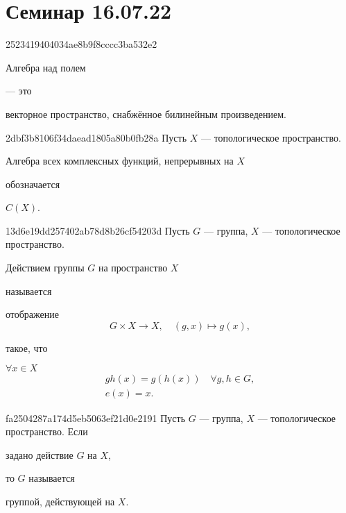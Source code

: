 


\section{Семинар 16.07.22}
\begin{note}{2523419404034ae8b9f8cccc3ba532e2}
    \begin{icloze}{2}Алгебра над полем\end{icloze} --- это \begin{icloze}{1}векторное пространство, снабжённое билинейным произведением.\end{icloze}
\end{note}

\begin{note}{2dbf3b8106f34daead1805a80b0fb28a}
    Пусть \({ X }\) --- топологическое пространство.
    \begin{icloze}{2}Алгебра всех комплексных функций, непрерывных на \({ X }\)\end{icloze} обозначается \begin{icloze}{1}\({ C(X) }\).\end{icloze}
\end{note}

\begin{note}{13d6e19dd257402ab78d8b26cf54203d}
    Пусть \({ G }\) --- группа, \({ X }\) --- топологическое пространство.
    \begin{icloze}{3}Действием группы \({ G }\) на пространство \({ X }\)\end{icloze} называется
    \begin{icloze}{1}
        отображение
        \[
            G \times X \to X, \quad (g, x) \mapsto g(x),
        \]
    \end{icloze}
    такое, что
    \begin{icloze}{2}
        \({ \forall x \in X }\)
        \[
            \begin{gathered}
                gh(x) = g(h(x)) \quad \forall g, h \in G, \\
                e(x) = x.
            \end{gathered}
        \]
    \end{icloze}
\end{note}

\begin{note}{fa2504287a174d5eb5063ef21d0e2191}
    Пусть \({ G }\) --- группа, \({ X }\) --- топологическое пространство.
    Если \begin{icloze}{2}задано действие \({ G }\) на \({ X }\),\end{icloze} то \({ G }\) называется \begin{icloze}{1}группой, действующей на \({ X }\).\end{icloze}
\end{note}

